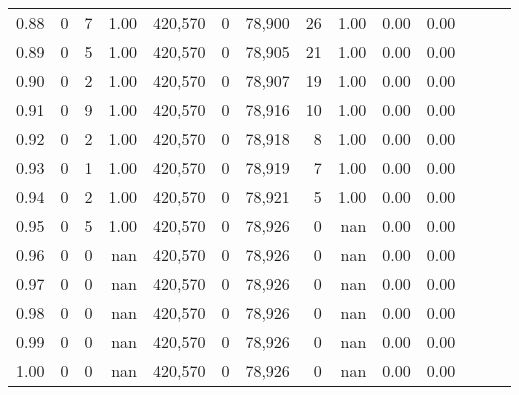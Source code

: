 \begin{tabular}{rrrrrrrrrrrrrr}
0.88 &       0 &      7 &  1.00 &  420,570 &        0 &  78,900 &      26 &  1.00 &  0.00 &      0.00 \\
0.89 &       0 &      5 &  1.00 &  420,570 &        0 &  78,905 &      21 &  1.00 &  0.00 &      0.00 \\
0.90 &       0 &      2 &  1.00 &  420,570 &        0 &  78,907 &      19 &  1.00 &  0.00 &      0.00 \\
0.91 &       0 &      9 &  1.00 &  420,570 &        0 &  78,916 &      10 &  1.00 &  0.00 &      0.00 \\
0.92 &       0 &      2 &  1.00 &  420,570 &        0 &  78,918 &       8 &  1.00 &  0.00 &      0.00 \\
0.93 &       0 &      1 &  1.00 &  420,570 &        0 &  78,919 &       7 &  1.00 &  0.00 &      0.00 \\
0.94 &       0 &      2 &  1.00 &  420,570 &        0 &  78,921 &       5 &  1.00 &  0.00 &      0.00 \\
0.95 &       0 &      5 &  1.00 &  420,570 &        0 &  78,926 &       0 &   nan &  0.00 &      0.00 \\
0.96 &       0 &      0 &   nan &  420,570 &        0 &  78,926 &       0 &   nan &  0.00 &      0.00 \\
0.97 &       0 &      0 &   nan &  420,570 &        0 &  78,926 &       0 &   nan &  0.00 &      0.00 \\
0.98 &       0 &      0 &   nan &  420,570 &        0 &  78,926 &       0 &   nan &  0.00 &      0.00 \\
0.99 &       0 &      0 &   nan &  420,570 &        0 &  78,926 &       0 &   nan &  0.00 &      0.00 \\
1.00 &       0 &      0 &   nan &  420,570 &        0 &  78,926 &       0 &   nan &  0.00 &      0.00 \\
\bottomrule
\end{tabular}

